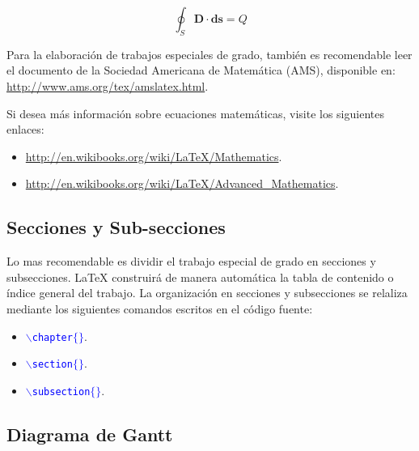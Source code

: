 \begin{equation}
\oint_S \mathbf{D}
\cdot \mathbf{ds}=Q
\end{equation}
                  

Para la elaboraci\'{o}n de trabajos especiales de grado, tambi\'{e}n es recomendable leer el documento de la Sociedad Americana de Matem\'{a}tica (AMS), disponible en:\\
\url{http://www.ams.org/tex/amslatex.html}.

\noindent Si desea más información sobre ecuaciones matemáticas, visite los siguientes enlaces:

\begin{itemize}
\item \url{http://en.wikibooks.org/wiki/LaTeX/Mathematics}.
\item \url{http://en.wikibooks.org/wiki/LaTeX/Advanced_Mathematics}.
\end{itemize}


\subsection{Secciones y Sub-secciones}

Lo mas recomendable es dividir el trabajo especial de grado en secciones y subsecciones. \LaTeX{} construir\'{a} de manera autom\'{a}tica la tabla de contenido o \'{i}ndice general del trabajo. La organizaci\'{o}n en secciones y subsecciones se relaliza mediante los siguientes comandos escritos en el c\'{o}digo fuente:

\begin{itemize}
\item \textcolor{blue}{$\backslash$\texttt{chapter}$\{\}$}.
\item \textcolor{blue}{$\backslash$\texttt{section}$\{\}$}. 
\item \textcolor{blue}{$\backslash$\texttt{subsection}$\{\}$}.
\end{itemize}

\subsection{Diagrama de Gantt}
\label{Gantt}

